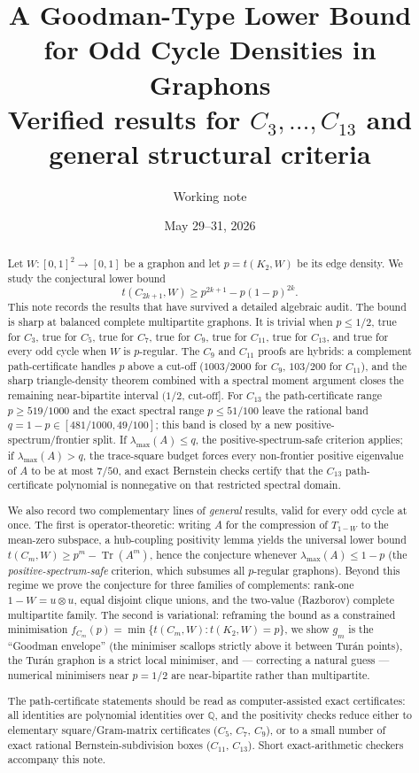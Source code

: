 \documentclass[11pt]{article}
\title{A Goodman-Type Lower Bound for Odd Cycle Densities in Graphons\\
\large Verified results for $C_3,\dots,C_{13}$ and general structural criteria}
\author{Working note}
\date{May 29--31, 2026}
\newcommand{\Tr}{\operatorname{Tr}}
\begin{document}
\maketitle

\begin{abstract}
Let $W:[0,1]^2\to[0,1]$ be a graphon and let $p=t(K_2,W)$ be its edge density.  We study the conjectural lower bound
\[
        t(C_{2k+1},W)\ge p^{2k+1}-p(1-p)^{2k}.
\]
This note records the results that have survived a detailed algebraic audit.  The bound is sharp at balanced complete multipartite graphons.  It is trivial when $p\le 1/2$, true for $C_3$, true for $C_5$, true for $C_7$, true for $C_9$, true for $C_{11}$, true for $C_{13}$, and true for every odd cycle when $W$ is $p$-regular.  The $C_9$ and $C_{11}$ proofs are hybrids: a complement path-certificate handles $p$ above a cut-off ($1003/2000$ for $C_9$, $103/200$ for $C_{11}$), and the sharp triangle-density theorem combined with a spectral moment argument closes the remaining near-bipartite interval $(1/2,\,\text{cut-off}]$.  For $C_{13}$ the path-certificate range $p\ge519/1000$ and the exact spectral range $p\le51/100$ leave the rational band $q=1-p\in[481/1000,49/100]$; this band is closed by a new positive-spectrum/frontier split.  If $\lambda_{\max}(A)\le q$, the positive-spectrum-safe criterion applies; if $\lambda_{\max}(A)>q$, the trace-square budget forces every non-frontier positive eigenvalue of $A$ to be at most $7/50$, and exact Bernstein checks certify that the $C_{13}$ path-certificate polynomial is nonnegative on that restricted spectral domain.

We also record two complementary lines of \emph{general} results, valid for every odd cycle at once.  The first is operator-theoretic: writing $A$ for the compression of $T_{1-W}$ to the mean-zero subspace, a hub-coupling positivity lemma yields the universal lower bound $t(C_m,W)\ge p^m-\Tr(A^m)$, hence the conjecture whenever $\lambda_{\max}(A)\le1-p$ (the \emph{positive-spectrum-safe} criterion, which subsumes all $p$-regular graphons).  Beyond this regime we prove the conjecture for three families of complements: rank-one $1-W=u\otimes u$, equal disjoint clique unions, and the two-value (Razborov) complete multipartite family.  The second is variational: reframing the bound as a constrained minimisation $f_{C_m}(p)=\min\{t(C_m,W):t(K_2,W)=p\}$, we show $g_m$ is the ``Goodman envelope'' (the minimiser scallops strictly above it between Tur\'an points), the Tur\'an graphon is a strict local minimiser, and --- correcting a natural guess --- numerical minimisers near $p=1/2$ are near-bipartite rather than multipartite.

The path-certificate statements should be read as computer-assisted exact certificates: all identities are polynomial identities over $\mathbb Q$, and the positivity checks reduce either to elementary square/Gram-matrix certificates ($C_5$, $C_7$, $C_9$), or to a small number of exact rational Bernstein-subdivision boxes ($C_{11}$, $C_{13}$).  Short exact-arithmetic checkers accompany this note.
\end{abstract}
\end{document}
